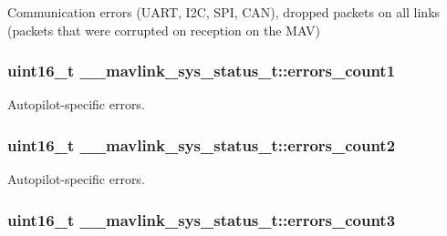 Communication errors (U\+A\+R\+T, I2\+C, S\+P\+I, C\+A\+N), dropped packets on all links (packets that were corrupted on reception on the M\+A\+V) 

\hypertarget{struct____mavlink__sys__status__t_a11e2c7144a8d17da05c2f070d919bfc5}{
\subsubsection[{errors\+\_\+count1}]{\setlength{\rightskip}{0pt plus 5cm}uint16\+\_\+t \+\_\+\+\_\+mavlink\+\_\+sys\+\_\+status\+\_\+t\+::errors\+\_\+count1}}\label{struct____mavlink__sys__status__t_a11e2c7144a8d17da05c2f070d919bfc5}


Autopilot-\/specific errors. 

\hypertarget{struct____mavlink__sys__status__t_a5a67792e19997897a415af3b4dba3d68}{
\subsubsection[{errors\+\_\+count2}]{\setlength{\rightskip}{0pt plus 5cm}uint16\+\_\+t \+\_\+\+\_\+mavlink\+\_\+sys\+\_\+status\+\_\+t\+::errors\+\_\+count2}}\label{struct____mavlink__sys__status__t_a5a67792e19997897a415af3b4dba3d68}


Autopilot-\/specific errors. 

\hypertarget{struct____mavlink__sys__status__t_aafca91f6177e4d0ed71410ac5b8f4ac8}{
\subsubsection[{errors\+\_\+count3}]{\setlength{\rightskip}{0pt plus 5cm}uint16\+\_\+t \+\_\+\+\_\+mavlink\+\_\+sys\+\_\+status\+\_\+t\+::errors\+\_\+count3}}\label{struct____mavlink__sys__status__t_aafca91f6177e4d0ed71410ac5b8f4ac8}


